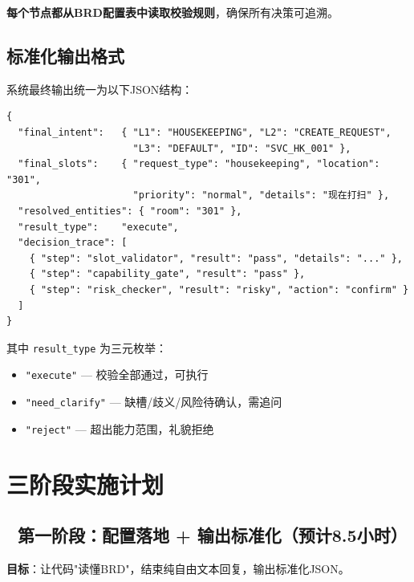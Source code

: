 \documentclass[12pt,a4paper]{ctexart}
\begin{document}
\textbf{每个节点都从BRD配置表中读取校验规则}，确保所有决策可追溯。

\subsection{标准化输出格式}

系统最终输出统一为以下JSON结构：

\begin{verbatim}
{
  "final_intent":   { "L1": "HOUSEKEEPING", "L2": "CREATE_REQUEST",
                      "L3": "DEFAULT", "ID": "SVC_HK_001" },
  "final_slots":    { "request_type": "housekeeping", "location": "301",
                      "priority": "normal", "details": "现在打扫" },
  "resolved_entities": { "room": "301" },
  "result_type":    "execute",
  "decision_trace": [
    { "step": "slot_validator", "result": "pass", "details": "..." },
    { "step": "capability_gate", "result": "pass" },
    { "step": "risk_checker", "result": "risky", "action": "confirm" }
  ]
}
\end{verbatim}

其中 \texttt{result\_type} 为三元枚举：
\begin{itemize}
    \item \texttt{"execute"} — 校验全部通过，可执行
    \item \texttt{"need\_clarify"} — 缺槽/歧义/风险待确认，需追问
    \item \texttt{"reject"} — 超出能力范围，礼貌拒绝
\end{itemize}

\newpage

\section{三阶段实施计划}

\subsection{🔴 第一阶段：配置落地 + 输出标准化（预计8.5小时）}

\textbf{目标}：让代码"读懂BRD"，结束纯自由文本回复，输出标准化JSON。
\end{document}
